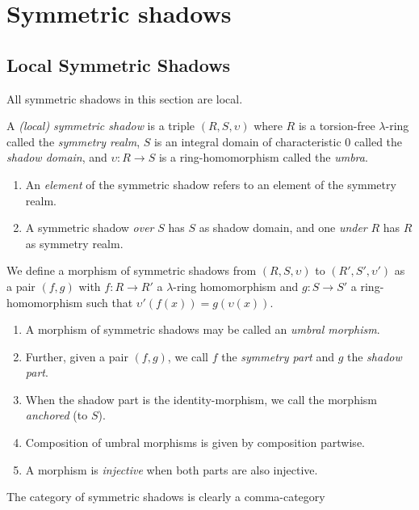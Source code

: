 
\section{Symmetric shadows}

\subsection{Local Symmetric Shadows}
All symmetric shadows in this section are local.
\begin{definition}
  A \emph{(local) symmetric shadow} is a triple $(R, S, \upsilon)$ where $R$ is a torsion-free $\lambda$-ring called the \emph{symmetry realm}, $S$ is an integral domain of characteristic $0$ called the \emph{shadow domain}, and $\upsilon: R \to S$ is a ring-homomorphism called the \emph{umbra}. 
  \begin{enumerate}
    \item An \emph{element} of the symmetric shadow refers to an element of the symmetry realm. 
    \item A symmetric shadow \emph{over} $S$ has $S$ as shadow domain, and one \emph{under} $R$ has $R$ as symmetry realm.
  \end{enumerate}
\end{definition}

\begin{definition}
  We define a morphism of symmetric shadows from $(R, S, \upsilon)$ to $(R', S', \upsilon')$ as a pair $(f, g)$ with $f : R \to R'$ a $\lambda$-ring homomorphism and $g : S \to S'$ a ring-homomorphism such that $\upsilon'(f(x)) = g(\upsilon(x))$. 
  \begin{enumerate}
    \item A morphism of symmetric shadows may be called an \emph{umbral morphism}. 
    \item Further, given a pair $(f, g)$, we call $f$ the \emph{symmetry part} and $g$ the \emph{shadow part}. 
    \item When the shadow part is the identity-morphism, we call the morphism \emph{anchored} (to $S$). 
    \item Composition of umbral morphisms is given by composition partwise. 
    \item A morphism is \emph{injective} when both parts are also injective. 
  \end{enumerate}
\end{definition}

\begin{remark}
  The category of symmetric shadows is clearly a comma-category
\end{remark}

